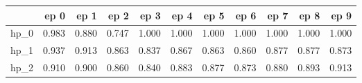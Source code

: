 \begin{tabular}{lrrrrrrrrrr}
\toprule
{} &   ep 0 &   ep 1 &   ep 2 &   ep 3 &   ep 4 &   ep 5 &   ep 6 &   ep 7 &   ep 8 &   ep 9 \\
\midrule
hp\_0 &  0.983 &  0.880 &  0.747 &  1.000 &  1.000 &  1.000 &  1.000 &  1.000 &  1.000 &  1.000 \\
hp\_1 &  0.937 &  0.913 &  0.863 &  0.837 &  0.867 &  0.863 &  0.860 &  0.877 &  0.877 &  0.873 \\
hp\_2 &  0.910 &  0.900 &  0.860 &  0.840 &  0.883 &  0.877 &  0.873 &  0.880 &  0.893 &  0.913 \\
\bottomrule
\end{tabular}
